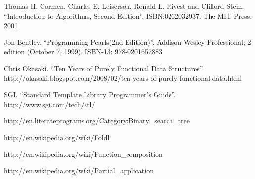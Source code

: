 \documentclass{article}
\begin{document}
\begin{thebibliography}{99}

Thomas H. Cormen, Charles E. Leiserson, Ronald L. Rivest and Clifford Stein. 
``Introduction to Algorithms, Second Edition''. ISBN:0262032937. The MIT Press. 2001

Jon Bentley. ``Programming Pearls(2nd Edition)''. Addison-Wesley Professional; 2 edition (October 7, 1999). ISBN-13: 978-0201657883

Chris Okasaki. ``Ten Years of Purely Functional Data Structures''. http://okasaki.blogspot.com/2008/02/ten-years-of-purely-functional-data.html

SGI. ``Standard Template Library Programmer's Guide''. http://www.sgi.com/tech/stl/

http://en.literateprograms.org/Category:Binary\_search\_tree

http://en.wikipedia.org/wiki/Foldl

http://en.wikipedia.org/wiki/Function\_composition

http://en.wikipedia.org/wiki/Partial\_application

\end{thebibliography}

\ifx\wholebook\relax\else
\end{document}
